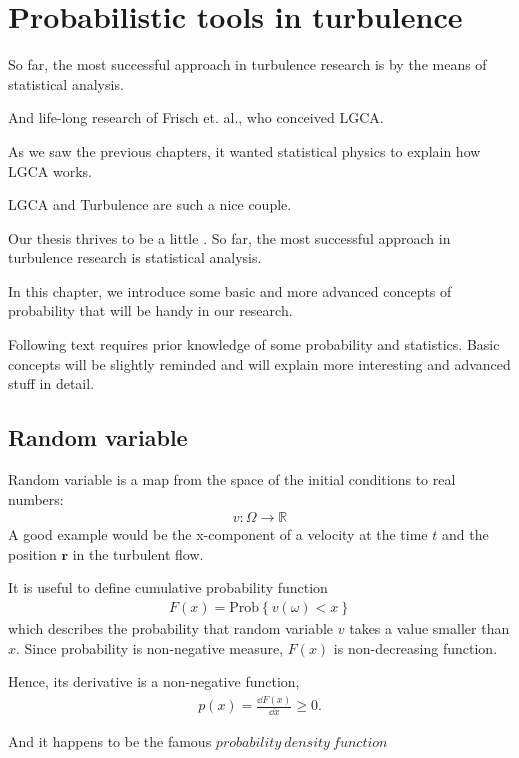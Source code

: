\chapter{Probabilistic tools in turbulence}


So far, the most successful approach in turbulence research is by the means of statistical analysis.

And life-long research of Frisch et. al., who conceived LGCA.

As we saw the previous chapters, it wanted statistical physics to explain how LGCA works.

LGCA and Turbulence are such a nice couple.

Our thesis thrives to be a little .
So far, the most successful approach in turbulence research is statistical analysis.

\bigskip

In this chapter, we introduce some basic and more advanced concepts of probability that will be handy in our research. 

Following text requires prior knowledge of some probability and statistics. Basic concepts will be slightly reminded and will explain more interesting and advanced stuff in detail.
\section{Random variable}

Random variable is a map from the space of the initial conditions to real numbers:
\begin{align}
v: \Omega \rightarrow \mathbb{R}
\end{align}
A good example would be the x-component of a velocity at the time $t$ and the position $\bm{r}$ in the turbulent flow.

\bigskip

It is useful to define cumulative probability function
\begin{align}
F(x) = \mathrm{Prob}\left\{v(\omega) < x\right\}
\end{align}
which describes the probability that random variable $v$ takes a value smaller than $x$. Since probability is non-negative measure, $F(x)$ is non-decreasing function. 

Hence, its derivative is a non-negative function,
\begin{align}
p(x) = \frac{\dd F(x)}{\dd x} \geq 0.
\end{align}

And it happens to be the famous $probability~density~function$

